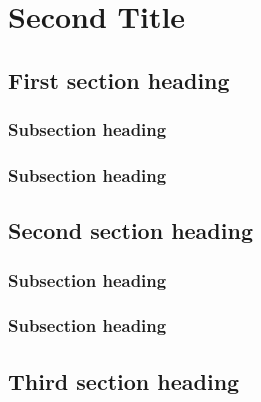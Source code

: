 \chapter[\DTMusedate{entry}]{Second Title}

\section{First section heading}
\lipsum[1]

\subsection{Subsection heading}
\lipsum[1-2]

\subsection{Subsection heading}
\lipsum[1-2]

\section{Second section heading}
\lipsum[3-5]

\subsection{Subsection heading}
\lipsum[1-2]

\subsection{Subsection heading}
\lipsum[1-2]

\section{Third section heading}
\lipsum[1]